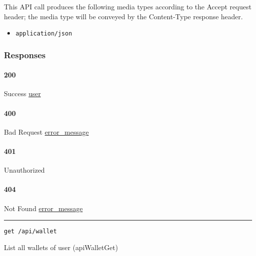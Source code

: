 This API call produces the following media types according to the
{Accept} request header; the media type will be conveyed by the
{Content-Type} response header.

\begin{itemize}
\tightlist
\item
  \texttt{application/json}
\end{itemize}

\hypertarget{responses-83}{%
\subsubsection{Responses}\label{responses-83}}

\hypertarget{section-270}{%
\paragraph{200}\label{section-270}}

Success \protect\hyperlink{user}{user}

\hypertarget{section-271}{%
\paragraph{400}\label{section-271}}

Bad Request \protect\hyperlink{error_message}{error\_message}

\hypertarget{section-272}{%
\paragraph{401}\label{section-272}}

Unauthorized \protect\hyperlink{}{}

\hypertarget{section-273}{%
\paragraph{404}\label{section-273}}

Not Found \protect\hyperlink{error_message}{error\_message}

\begin{center}\rule{0.5\linewidth}{\linethickness}\end{center}

\protect\hypertarget{apiWalletGet}{}{}

\begin{verbatim}
get /api/wallet
\end{verbatim}

List all wallets of user ({apiWalletGet})


